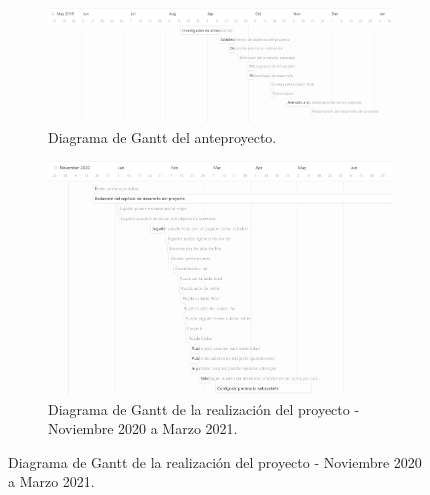 \begin{figure}[H]
    \centering
    \begin{subfigure}{\textwidth}
        \centering
        \includegraphics[width=0.8\linewidth]{images/ago-dec-19.png}
        \caption{Diagrama de Gantt del anteproyecto.}
        \label{fig:gantt_anteproyecto}
    \end{subfigure}
    \begin{subfigure}{\textwidth}
        \centering
        \includegraphics[width=0.8\linewidth]{images/ene-mar-21.png}
        \caption{Diagrama de Gantt de la realización del proyecto - Noviembre 2020 a Marzo 2021.}
        \label{fig:gantt_proyecto}
    \end{subfigure}
\end{figure}
